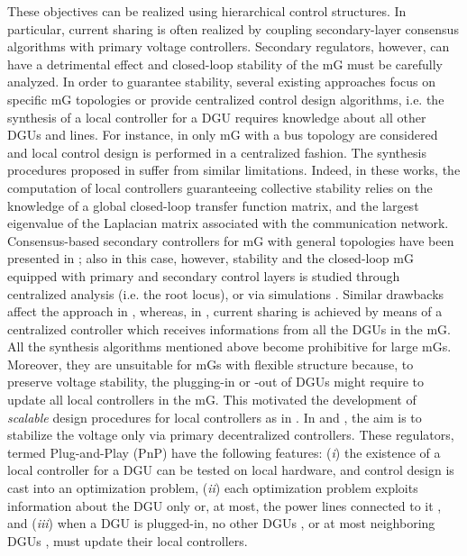 \documentclass[a4paper]{article}
\theoremstyle{plain}
\begin{document}
These objectives can be realized using hierarchical control structures. 
In particular, current sharing is often realized by coupling secondary-layer consensus algorithms with primary voltage controllers. Secondary regulators, however, can have a detrimental effect and closed-loop stability of the mG must be carefully analyzed. In order to guarantee stability, several existing approaches focus on specific mG topologies or provide centralized control design algorithms, i.e. the synthesis of a local controller for a DGU requires knowledge about all other DGUs and lines. For instance,  in \cite{behjati2014modular,moayedi2015team} only mG with a bus topology are considered and local control design is performed in a centralized fashion. The synthesis procedures proposed in \cite{6816073,8026170} suffer from similar limitations. Indeed, in these works, the computation of local controllers guaranteeing collective stability relies on the knowledge of a global closed-loop transfer function matrix, and the largest eigenvalue of the Laplacian matrix associated with the communication network.
	Consensus-based secondary controllers for mG with general topologies have been presented in \cite{shafiee2014distributed_b}; also in this case, however, stability and the closed-loop mG equipped with primary and secondary control layers is studied through centralized analysis (i.e. the root locus), or via simulations \cite{dragicevic2015dc}. Similar drawbacks affect the approach in \cite{meng2015modeling}, whereas, in \cite{Setiawan2017}, current sharing is achieved by means of a centralized controller which receives informations from all the DGUs in the mG.
All the synthesis algorithms mentioned above become prohibitive for large mGs. Moreover, they are unsuitable for mGs with flexible structure because, to preserve voltage stability, the plugging-in
or -out of DGUs might require to update all local controllers in
the mG. This motivated the development of \emph{scalable} design procedures
for local controllers as in \cite{tucci2015decentralized, tucci2016improved,zhao2015distributed}.
In \cite{tucci2015decentralized} and \cite{tucci2016improved}, the aim is to stabilize the  voltage only via primary decentralized controllers. These regulators, termed Plug-and-Play (PnP) have the following features: (\textit{i}) the existence of a local controller for a DGU can be tested on local hardware, and control design is cast into an optimization problem, (\textit{ii}) each optimization problem exploits information about the DGU only \cite{tucci2016improved} or, at most, the power lines connected to it \cite{tucci2015decentralized}, and (\textit{iii}) when a DGU is plugged-in, no other DGUs \cite{tucci2016improved}, or at most neighboring DGUs \cite{tucci2015decentralized}, must update their local controllers.
\end{document}
